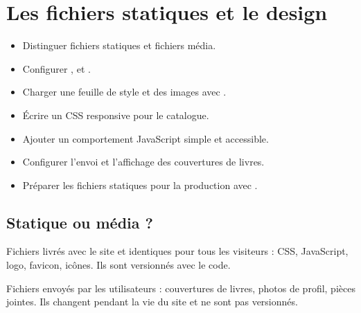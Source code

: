 \chapter{Les fichiers statiques et le design}
\label{ch:statiques}


\begin{objectifs}
\begin{itemize}
  \item Distinguer fichiers statiques et fichiers média.
  \item Configurer ,  et
        .
  \item Charger une feuille de style et des images avec .
  \item Écrire un CSS responsive pour le catalogue.
  \item Ajouter un comportement JavaScript simple et accessible.
  \item Configurer l'envoi et l'affichage des couvertures de livres.
  \item Préparer les fichiers statiques pour la production avec
        .
\end{itemize}
\end{objectifs}

\section{Statique ou média ?}

\begin{description}[leftmargin=3.5cm,style=nextline]
  \item[Fichiers statiques] Fichiers livrés avec le site et identiques pour tous
  les visiteurs : CSS, JavaScript, logo, favicon, icônes. Ils sont versionnés avec
  le code.
  \item[Fichiers média] Fichiers envoyés par les utilisateurs : couvertures de
  livres, photos de profil, pièces jointes. Ils changent pendant la vie du site et
  ne sont pas versionnés.
\end{description}

